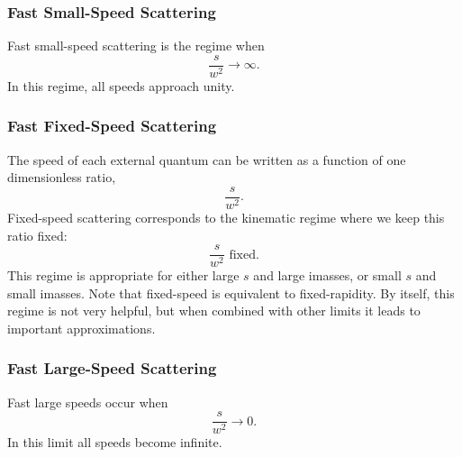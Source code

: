 \subsubsection{Fast Small-Speed Scattering}
Fast small-speed scattering is the regime when
\begin{equation}
	\frac{s}{w^{2}} \rightarrow \infty.
\end{equation}
In this regime, all speeds approach unity.
\subsubsection{Fast Fixed-Speed Scattering}
The speed of each external quantum can be written as a function of one dimensionless ratio,
\begin{equation}
	\frac{s}{w^{2}}.
\end{equation}
Fixed-speed scattering corresponds to the kinematic regime where we keep this ratio fixed:
\begin{equation}
	\frac{s}{w^{2}} \text{ fixed}.
\end{equation}
This regime is appropriate for either large $s$ and large imasses, or small $s$ and small imasses. Note that fixed-speed is equivalent to fixed-rapidity. By itself, this regime is not very helpful, but when combined with other limits it leads to important approximations.
\subsubsection{Fast Large-Speed Scattering}
Fast large speeds occur when
\begin{equation}
	\frac{s}{w^{2}} \rightarrow 0.
\end{equation}
In this limit all speeds become infinite.
